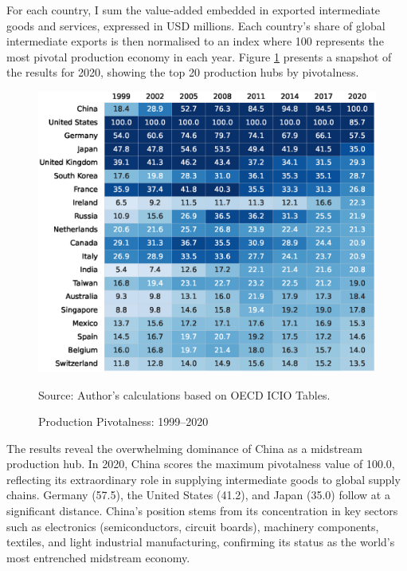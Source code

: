 \documentclass[11pt]{article}
\begin{document}
For each country, I sum the value-added embedded in exported intermediate goods and services, expressed in USD millions. Each country's share of global intermediate exports is then normalised to an index where 100 represents the most pivotal production economy in each year. Figure \ref{fig:pivotal_production} presents a snapshot of the results for 2020, showing the top 20 production hubs by pivotalness.

\begin{figure}[ht]
	\caption{Production Pivotalness: 1999–2020}
	\label{fig:pivotal_production}
	\centering
        \phantom{a}
	\includegraphics[width=\textwidth]{dataviz/results_pivotal2_snapshot.eps}

	{\footnotesize Source: Author's calculations based on OECD ICIO Tables.}
\end{figure}

The results reveal the overwhelming dominance of China as a midstream production hub. In 2020, China scores the maximum pivotalness value of 100.0, reflecting its extraordinary role in supplying intermediate goods to global supply chains. Germany (57.5), the United States (41.2), and Japan (35.0) follow at a significant distance. China's position stems from its concentration in key sectors such as electronics (semiconductors, circuit boards), machinery components, textiles, and light industrial manufacturing, confirming its status as the world's most entrenched midstream economy.
\end{document}
